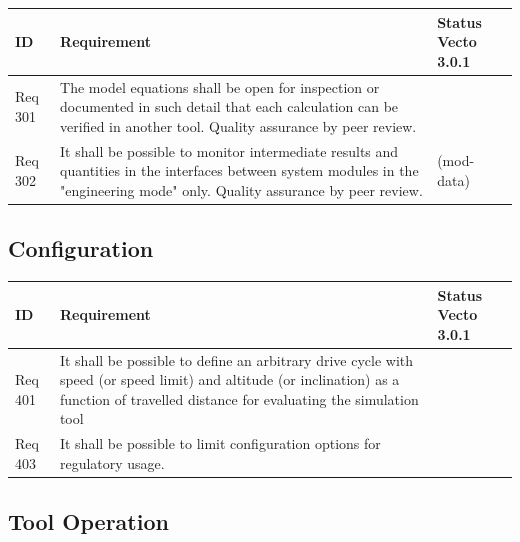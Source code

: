 \begin{tabular}{L{\IdColWidth}|L{\ReqColWidth}|M{\StatusColWidth}}
ID & Requirement & Status Vecto 3.0.1 \\ \hline\hline
Req 301 & The model equations shall be open for inspection or documented in such detail that each calculation can be verified in another tool.	Quality assurance by peer review. & 
	\Vcheck	\\ \hline
Req 302 & It shall be possible to monitor intermediate results and quantities in the interfaces between system modules in the  "engineering mode" only.	Quality assurance by peer review. & 
	\Vcheck \newline (mod-data)	\\ \hline
\end{tabular}

\subsection{Configuration} %
\label{sub:configuration}

\begin{tabular}{L{\IdColWidth}|L{\ReqColWidth}|M{\StatusColWidth}}
ID & Requirement & Status Vecto 3.0.1 \\ \hline\hline
Req 401 & It shall be possible to define an arbitrary drive cycle with speed (or speed limit) and altitude (or inclination) as a function of travelled distance for evaluating the simulation tool & 
	\Vcheck	 \\ \hline
Req 403 & It shall be possible to limit configuration options for regulatory usage. & 
	\Vcheck	 \\ \hline
\end{tabular}

\subsection{Tool Operation} %
\label{sub:tool_operation}

